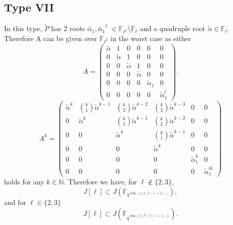 \documentclass[11pt,a4paper]{article}
\theoremstyle{plain}
\theoremstyle{definition}
\theoremstyle{remark}
\DeclareMathOperator{\lcm}{lcm}
\begin{document}
\subsection*{Type VII}
In this type, $\tilde{P}$ has 2 roots $\tilde{\alpha_1},\tilde{\alpha_1}^{\ell}$
$\in \mathbb{F}_{\ell^2}\setminus \mathbb{F}_{\ell}$   and a
quadruple root $\tilde{\alpha}\in \mathbb{F}_{\ell} $. Therefore A can be given over $\mathbb{F}_{\ell^2} $ in the worst case as either
\[
A =
\begin{pmatrix}
\tilde{\alpha} & 1 & 0 & 0 & 0 & 0\\
0 & \tilde{\alpha} & 1 & 0 & 0 & 0\\
0 & 0 & \tilde{\alpha} & 1 & 0 & 0\\
0 & 0 & 0 & \tilde{\alpha} & 0 & 0\\
0 & 0 & 0 & 0 & \tilde{\alpha}_1 & 0\\
0 & 0 & 0 & 0 & 0 & \tilde{\alpha}_1^{l}
\end{pmatrix}.
\]
\[
A^k =
\begin{pmatrix}
\tilde{\alpha}^{k} &
\binom{k}{1}\tilde{\alpha}^{k-1} &
\binom{k}{2}\tilde{\alpha}^{k-2} &
\binom{k}{3}\tilde{\alpha}^{k-3} &
0 & 0
\\
0 &
\tilde{\alpha}^{k} &
\binom{k}{1}\tilde{\alpha}^{k-1} &
\binom{k}{2}\tilde{\alpha}^{k-2} &
0 & 0
\\
0 & 0 &
\tilde{\alpha}^{k} &
\binom{k}{1}\tilde{\alpha}^{k-1} &
0 & 0
\\
0 & 0 & 0 &
\tilde{\alpha}^{k} &
0 & 0
\\
0 & 0 & 0 & 0 &
\tilde{\alpha}_1^{k} &
0
\\
0 & 0 & 0 & 0 & 0 &
\tilde{\alpha}_1^{lk}
\end{pmatrix}
\]
holds for any $k \in \mathbb{N}$. Therefore we have, for  $ \ell \not\in\{2, 3\}$,
\begin{equation*}
    J[\ell] \subset J (\mathbb{F}_{q^{\lcm(e_r\ell,e(\ell+1))}} ) ,
\end{equation*}
and for $\ell\in \{2,3\}$
\begin{equation*}
    J[\ell] \subset J (\mathbb{F}_{q^{\lcm(e_r\ell^2,e(\ell+1))}} ). 
\end{equation*}
\end{document}
